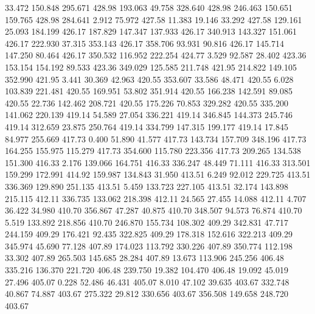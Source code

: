   33.472  150.848  295.671       428.98
 193.063   49.758  328.640       428.98
 246.463  150.651  159.765       428.98
 284.641    2.912   75.972       427.58
  11.383   19.146   33.292       427.58
 129.161   25.093  184.199       426.17
 187.829  147.347  137.933       426.17
 340.913  143.327  151.061       426.17
 222.930   37.315  353.143       426.17
 358.706   93.931   90.816       426.17
 145.714  147.250   80.464       426.17
 350.532  116.952  222.254       424.77
   3.529   92.587   28.402       423.36
 153.154  154.192   89.533       423.36
 349.029  125.585  211.748       421.95
 214.822  149.105  352.990       421.95
   3.441   30.369   42.963       420.55
 353.607   33.586   48.471       420.55
   6.028  103.839  221.481       420.55
 169.951   53.802  351.914       420.55
 166.238  142.591   89.085       420.55
  22.736  142.462  208.721       420.55
 175.226   70.853  329.282       420.55
 335.200  141.062  220.139       419.14
  54.589   27.054  336.221       419.14
 346.845  144.373  245.746       419.14
 312.659   23.875  250.764       419.14
 334.799  147.315  199.177       419.14
  17.845   84.977  255.669       417.73
   0.400   51.890   41.577       417.73
 143.734  157.709  348.196       417.73
 164.255  155.975  115.279       417.73
 354.600  115.780  223.356       417.73
 209.265  134.538  151.300       416.33
   2.176  139.066  164.751       416.33
 336.247   48.449   71.111       416.33
 313.501  159.299  172.991       414.92
 159.987  134.843   31.950       413.51
   6.249   92.012  229.725       413.51
 336.369  129.890  251.135       413.51
   5.459  133.723  227.105       413.51
  32.174  143.898  215.115       412.11
 336.735  133.062  218.398       412.11
  24.565   27.455   14.088       412.11
   4.707   36.422   34.980       410.70
 356.867   47.287   40.875       410.70
 348.507   94.573   76.874       410.70
   5.519  133.892  218.856       410.70
 246.870  155.734  108.302       409.29
 342.831   47.717  244.159       409.29
 176.421   92.435  322.825       409.29
 178.318  152.616  322.213       409.29
 345.974   45.690   77.128       407.89
 174.023  113.792  330.226       407.89
 350.774  112.198   33.302       407.89
 265.503  145.685   28.284       407.89
  13.673  113.906  245.256       406.48
 335.216  136.370  221.720       406.48
 239.750   19.382  104.470       406.48
  19.092   45.019   27.496       405.07
   0.228   52.486   46.431       405.07
   8.010   47.102   39.635       403.67
 332.748   40.867   74.887       403.67
 275.322   29.812  330.656       403.67
 356.508  149.658  248.720       403.67
